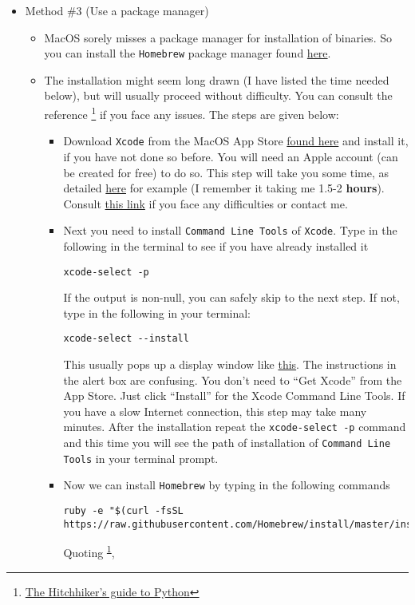 \documentclass[11pt]{article}
\begin{document}
\begin{itemize}
\item Method \#3 (Use a package manager)
\label{sec:org815c77f}
\begin{itemize}
\item MacOS sorely misses a package manager for installation of binaries. So you
can install the \texttt{Homebrew} package manager found \href{https://brew.sh/}{here}.
\item The installation might seem long drawn (I have listed the time needed
below), but will usually proceed without difficulty. You can consult the
reference \footnote{\href{https://docs.python-guide.org/starting/install3/osx/}{The Hitchhiker's guide to Python}\label{org58c8c5b}} if you face any issues. The steps are given below:
\begin{itemize}
\item Download \texttt{Xcode} from the MacOS App Store \href{https://developer.apple.com/xcode/}{found here} and install it, if you have not
done so before. You will need an Apple account (can be created for free) to do so. This step will take you some time, as
detailed \href{https://stackoverflow.com/questions/32701043/how-long-should-xcode-7-installation-take}{here} for example (I remember it taking me 1.5-2 \textbf{hours}).
Consult \href{https://medium.com/@LondonAppBrewery/how-to-download-and-setup-xcode-10-for-ios-development-b63bed1865c}{this link} if you face any difficulties or contact me.
\item Next you need to install \texttt{Command Line Tools} of \texttt{Xcode}. Type in the
following in the terminal to see if you have already installed it
\begin{verbatim}
xcode-select -p
\end{verbatim}
If the output is non-null, you can safely skip to the next step. If not,
type in the following in your terminal:
\begin{verbatim}
xcode-select --install
\end{verbatim}
This usually pops up a display window like \href{https://railsapps.github.io/images/installing-mavericks-popup.png}{this}. The instructions in the
alert box are confusing. You don’t need to ``Get Xcode'' from the App
Store. Just click ``Install'' for the Xcode Command Line Tools. If you have
a slow Internet connection, this step may take many minutes. After the
installation repeat the \texttt{xcode-select -p}  command and this time you will
see the path of installation of \texttt{Command Line Tools} in your terminal prompt.
\item Now we can install \texttt{Homebrew} by typing in the following commands
\begin{verbatim}
ruby -e "$(curl -fsSL https://raw.githubusercontent.com/Homebrew/install/master/install)"
\end{verbatim}
Quoting \textsuperscript{\cref{org58c8c5b}},


\end{itemize}
\end{itemize}
\end{itemize}
\end{document}

